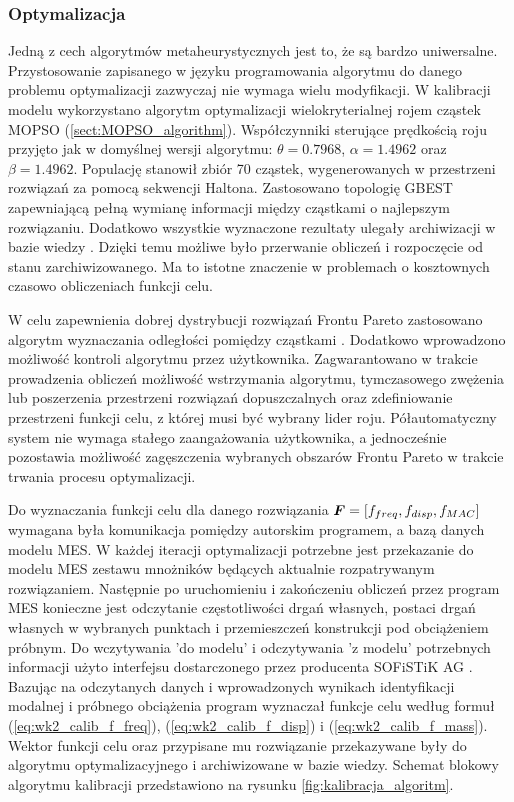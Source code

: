 \subsubsection{Optymalizacja}
Jedną z cech algorytmów metaheurystycznych jest to, że są bardzo uniwersalne. Przystosowanie zapisanego w języku programowania algorytmu do danego problemu optymalizacji zazwyczaj nie wymaga wielu modyfikacji. W kalibracji modelu wykorzystano algorytm optymalizacji wielokryterialnej rojem cząstek MOPSO (\ref{sect:MOPSO_algorithm}). Współczynniki sterujące prędkością roju przyjęto jak w domyślnej wersji algorytmu: $\theta=0.7968$, $\alpha=1.4962$ oraz $\beta=1.4962$. Populację stanowił zbiór 70 cząstek, wygenerowanych w przestrzeni rozwiązań za pomocą sekwencji Haltona. Zastosowano topologię GBEST zapewniającą pełną wymianę informacji między cząstkami o najlepszym rozwiązaniu. Dodatkowo wszystkie wyznaczone rezultaty ulegały archiwizacji w bazie wiedzy . Dzięki temu możliwe było przerwanie obliczeń i rozpoczęcie od stanu zarchiwizowanego. Ma to istotne znaczenie w problemach o kosztownych czasowo obliczeniach funkcji celu. 

W celu zapewnienia dobrej dystrybucji rozwiązań Frontu Pareto zastosowano algorytm wyznaczania odległości pomiędzy cząstkami \parencite{Deb2002}. Dodatkowo wprowadzono możliwość kontroli algorytmu przez użytkownika. Zagwarantowano w trakcie prowadzenia obliczeń możliwość wstrzymania algorytmu, tymczasowego zwężenia lub poszerzenia przestrzeni rozwiązań dopuszczalnych oraz zdefiniowanie przestrzeni funkcji celu, z której musi być wybrany lider roju. Półautomatyczny system nie wymaga stałego zaangażowania użytkownika, a jednocześnie pozostawia możliwość zagęszczenia wybranych obszarów Frontu Pareto w trakcie trwania procesu optymalizacji.

Do wyznaczania funkcji celu dla danego rozwiązania $\bm{F}=[f_{freq},f_{disp},f_{MAC}]$ wymagana była komunikacja pomiędzy autorskim programem, a bazą danych modelu MES. W każdej iteracji optymalizacji potrzebne jest przekazanie do modelu MES zestawu mnożników będących aktualnie rozpatrywanym rozwiązaniem. Następnie po uruchomieniu i zakończeniu obliczeń przez program MES konieczne jest odczytanie częstotliwości drgań własnych, postaci drgań własnych w wybranych punktach i przemieszczeń konstrukcji pod obciążeniem próbnym. Do wczytywania 'do modelu' i odczytywania 'z modelu' potrzebnych informacji użyto interfejsu dostarczonego przez producenta SOFiSTiK AG \parencite{SOFISTIK2018}. Bazując na odczytanych danych i wprowadzonych wynikach identyfikacji modalnej i próbnego obciążenia program wyznaczał funkcje celu według formuł (\ref{eq:wk2_calib_f_freq}), (\ref{eq:wk2_calib_f_disp}) i (\ref{eq:wk2_calib_f_mass}). Wektor funkcji celu oraz przypisane mu rozwiązanie przekazywane były do algorytmu optymalizacyjnego i archiwizowane w bazie wiedzy. Schemat blokowy algorytmu kalibracji przedstawiono na rysunku \ref{fig:kalibracja_algoritm}. 

